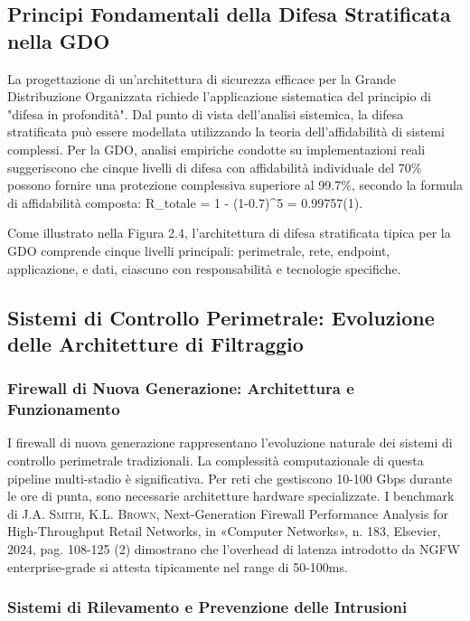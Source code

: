 \documentclass[12pt,a4paper,oneside]{book}
\newcommand{\autore}[1]{\textsc{#1}}
\newcommand{\citarticolo}[7]{%
    \autore{#1}, #2, in «#3», n. #4, #5, #6, pag. #7%
}
\begin{document}
\subsection{Principi Fondamentali della Difesa Stratificata nella GDO}

La progettazione di un'architettura di sicurezza efficace per la Grande Distribuzione Organizzata richiede l'applicazione sistematica del principio di "difesa in profondità". Dal punto di vista dell'analisi sistemica, la difesa stratificata può essere modellata utilizzando la teoria dell'affidabilità di sistemi complessi. Per la GDO, analisi empiriche condotte su implementazioni reali suggeriscono che cinque livelli di difesa con affidabilità individuale del 70\% possono fornire una protezione complessiva superiore al 99.7\%, secondo la formula di affidabilità composta: R\_totale = 1 - (1-0.7)^5 = 0.99757(1).

Come illustrato nella Figura 2.4, l'architettura di difesa stratificata tipica per la GDO comprende cinque livelli principali: perimetrale, rete, endpoint, applicazione, e dati, ciascuno con responsabilità e tecnologie specifiche.

\subsection{Sistemi di Controllo Perimetrale: Evoluzione delle Architetture di Filtraggio}

\subsubsection{Firewall di Nuova Generazione: Architettura e Funzionamento}

I firewall di nuova generazione rappresentano l'evoluzione naturale dei sistemi di controllo perimetrale tradizionali. La complessità computazionale di questa pipeline multi-stadio è significativa. Per reti che gestiscono 10-100 Gbps durante le ore di punta, sono necessarie architetture hardware specializzate. I benchmark di \citarticolo{J.A. Smith, K.L. Brown}{Next-Generation Firewall Performance Analysis for High-Throughput Retail Networks}{Computer Networks}{183}{Elsevier}{2024}{108-125}(2) dimostrano che l'overhead di latenza introdotto da NGFW enterprise-grade si attesta tipicamente nel range di 50-100ms.

\subsubsection{Sistemi di Rilevamento e Prevenzione delle Intrusioni}
\end{document}
